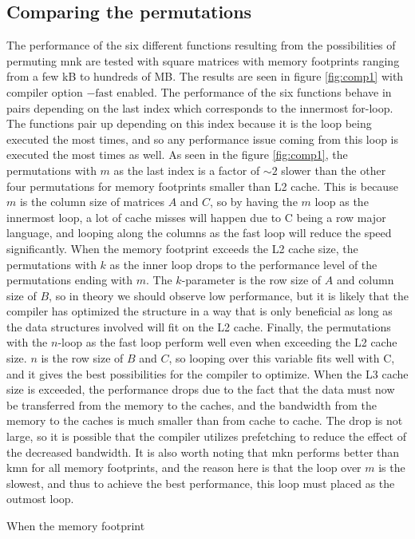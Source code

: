 \subsection{Comparing the permutations}
The performance of the six different functions resulting from the possibilities of permuting mnk are tested with square matrices with memory footprints ranging from a few kB to hundreds of MB. The results are seen in figure \ref{fig:comp1} with compiler option $\mathrm{-fast}$ enabled. The performance of the six functions behave in pairs depending on the last index which corresponds to the innermost for-loop. The functions pair up depending on this index because it is the loop being executed the most times, and so any performance issue coming from this loop is executed the most times as well. As seen in the figure \ref{fig:comp1}, the permutations with $m$ as the last index is a factor of $\sim 2$ slower than the other four permutations for memory footprints smaller than L2 cache. This is because $m$ is the column size of matrices $A$ and $C$, so by having the $m$ loop as the innermost loop, a lot of cache misses will happen due to C being a row major language, and looping along the columns as the fast loop will reduce the speed significantly. When the memory footprint exceeds the L2 cache size, the permutations with $k$ as the inner loop drops to the performance level of the permutations ending with $m$. The $k$-parameter is the row size of $A$ and column size of $B$, so in theory we should observe low performance, but it is likely that the compiler has optimized the structure in a way that is only beneficial as long as the data structures involved will fit on the L2 cache. Finally, the permutations with the $n$-loop as the fast loop perform well even when exceeding the L2 cache size. $n$ is the row size of $B$ and $C$, so looping over this variable fits well with C, and it gives the best possibilities for the compiler to optimize. When the L3 cache size is exceeded, the performance drops due to the fact that the data must now be transferred from the memory to the caches, and the bandwidth from the memory to the caches is much smaller than from cache to cache. The drop is not large, so it is possible that the compiler utilizes prefetching to reduce the effect of the decreased bandwidth. It is also worth noting that mkn performs better than kmn for all memory footprints, and the reason here is that the loop over $m$ is the slowest, and thus to achieve the best performance, this loop must placed as the outmost loop.

When the memory footprint 

